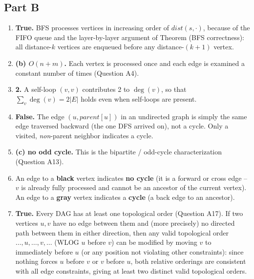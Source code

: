 \documentclass[11pt]{article}
\begin{document}
\subsection*{Part B}

\begin{enumerate}[label=\textbf{B\arabic*.}, leftmargin=2.2em]

\item \textbf{True.} BFS processes vertices in increasing order of $dist(s,\cdot)$,
because of the FIFO queue and the layer-by-layer argument of Theorem (BFS correctness): all
distance-$k$ vertices are enqueued before any distance-$(k+1)$ vertex.

\item \textbf{(b) $O(n+m)$.} Each vertex is processed once and each edge is examined a
constant number of times (Question A4).

\item \textbf{2.} A self-loop $(v,v)$ contributes 2 to $\deg(v)$, so that
$\sum_v \deg(v) = 2|E|$ holds even when self-loops are present.

\item \textbf{False.} The edge $(u, parent[u])$ in an undirected graph is simply the same
edge traversed backward (the one DFS arrived on), not a cycle. Only a visited,
\emph{non}-parent neighbor indicates a cycle.

\item \textbf{(c) no odd cycle.} This is the bipartite / odd-cycle characterization
(Question A13).

\item An edge to a \textbf{black} vertex indicates \textbf{no cycle} (it is a forward or
cross edge -- $v$ is already fully processed and cannot be an ancestor of the current
vertex). An edge to a \textbf{gray} vertex indicates a \textbf{cycle} (a back edge to an
ancestor).

\item \textbf{True.} Every DAG has at least one topological order (Question A17). If two
vertices $u,v$ have no edge between them and (more precisely) no directed path between
them in either direction, then any valid topological order $\dots, u, \dots, v, \dots$
(WLOG $u$ before $v$) can be modified by moving $v$ to immediately before $u$ (or any
position not violating other constraints): since nothing forces $u$ before $v$ or $v$
before $u$, both relative orderings are consistent with all edge constraints, giving at
least two distinct valid topological orders.


\end{enumerate}
\end{document}
